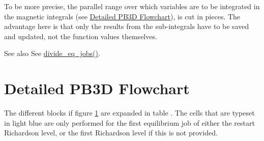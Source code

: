 To be more precise, the parallel range over which variables are to be integrated in the magnetic integrals (see \hyperlink{page_overview_detail_PB3D}{Detailed P\+B3D Flowchart}), is cut in pieces. The advantage here is that only the results from the sub-\/integrals have to be saved and updated, not the function values themselves.

\begin{DoxySeeAlso}{See also}
See \hyperlink{namespaceeq__ops_a576434bcf37c1647c6882429a8fa9243}{divide\+\_\+eq\+\_\+jobs()}.
\end{DoxySeeAlso}
\hypertarget{page_overview_detail_PB3D}{}\section{Detailed P\+B3\+D Flowchart}\label{page_overview_detail_PB3D}
The different blocks if figure \hyperlink{page_overview_flowchart_fig}{1} are expanded in table . The cells that are typeset in light blue are only performed for the first equilibrium job of either the restart Richardson level, or the first Richardson level if this is not provided. \hypertarget{page_overview_flowchart_PB3D_tab}{}
\tabulinesep=1mm

